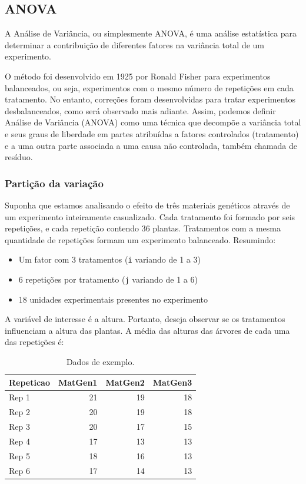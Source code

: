 \documentclass[
]{article}
\providecommand{\tightlist}{%
  \setlength{\itemsep}{0pt}\setlength{\parskip}{0pt}}
\begin{document}
\hypertarget{anova}{%
\subsection{ANOVA}\label{anova}}

A Análise de Variância, ou simplesmente ANOVA, é uma análise estatística para determinar a contribuição de diferentes fatores na variância total de um experimento.

O método foi desenvolvido em 1925 por Ronald Fisher para experimentos balanceados, ou seja, experimentos com o mesmo número de repetições em cada tratamento. No entanto, correções foram desenvolvidas para tratar experimentos desbalanceados, como será observado mais adiante. Assim, podemos definir Análise de Variância (ANOVA) como uma técnica que decompõe a variância total e seus graus de liberdade em partes atribuídas a fatores controlados (tratamento) e a uma outra parte associada a uma causa não controlada, também chamada de resíduo.

\hypertarget{partiuxe7uxe3o-da-variauxe7uxe3o}{%
\subsubsection{Partição da variação}\label{partiuxe7uxe3o-da-variauxe7uxe3o}}

Suponha que estamos analisando o efeito de três materiais genéticos através de um experimento inteiramente casualizado. Cada tratamento foi formado por seis repetições, e cada repetição contendo 36 plantas. Tratamentos com a mesma quantidade de repetições formam um experimento balanceado. Resumindo:

\begin{itemize}
\tightlist
\item
  Um fator com 3 tratamentos (\texttt{i} variando de 1 a 3)
\item
  6 repetições por tratamento (\texttt{j} variando de 1 a 6)
\item
  18 unidades experimentais presentes no experimento
\end{itemize}

A variável de interesse é a altura. Portanto, deseja observar se os tratamentos influenciam a altura das plantas. A média das alturas das árvores de cada uma das repetições é:

\begin{table}

\caption{\label{tab:unnamed-chunk-1}Dados de exemplo.}
\centering
\begin{tabular}[t]{l|r|r|r}
\hline
Repeticao & MatGen1 & MatGen2 & MatGen3\\
\hline
Rep 1 & 21 & 19 & 18\\
\hline
Rep 2 & 20 & 19 & 18\\
\hline
Rep 3 & 20 & 17 & 15\\
\hline
Rep 4 & 17 & 13 & 13\\
\hline
Rep 5 & 18 & 16 & 13\\
\hline
Rep 6 & 17 & 14 & 13\\
\hline
\end{tabular}
\end{table}
\end{document}
